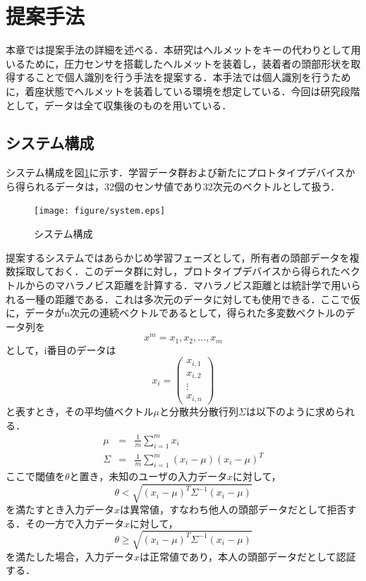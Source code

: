 \documentclass[Japanese]{dicomopapers}
\begin{document}
\section{提案手法}
本章では提案手法の詳細を述べる．本研究はヘルメットをキーの代わりとして用いるために，圧力センサを搭載したヘルメットを装着し，装着者の頭部形状を取得することで個人識別を行う手法を提案する．本手法では個人識別を行うために，着座状態でヘルメットを装着している環境を想定している．今回は研究段階として，データは全て収集後のものを用いている．

\subsection{システム構成}
システム構成を図\ref{system}に示す．学習データ群および新たにプロトタイプデバイスから得られるデータは，32個のセンサ値であり32次元のベクトルとして扱う．\par

\begin{figure}[!t]
  \begin{center}
    \texttt{[image: figure/system.eps]}
  \end{center}
  \caption{システム構成}
  \label{system}
\end{figure}

提案するシステムではあらかじめ学習フェーズとして，所有者の頭部データを複数採取しておく．このデータ群に対し，プロトタイプデバイスから得られたベクトルからのマハラノビス距離を計算する．マハラノビス距離とは統計学で用いられる一種の距離である．これは多次元のデータに対しても使用できる．ここで仮に，データがn次元の連続ベクトルであるとして，得られた多変数ベクトルのデータ列を
\[
  x^m = x_1, x_2, \ldots, x_m
\]
として，i番目のデータは
\[
  x_i = \left(
        \begin{array}{c}
            x_{i,1} \\
            x_{i,2} \\
            \vdots \\
            x_{i,n}
        \end{array}
    \right)
\]
と表すとき，その平均値ベクトル$\mu$と分散共分散行列$\Sigma$は以下のように求められる．
\begin{eqnarray*}
  \mu &=& \frac{1}{m}\sum_{i=1}^{m}x_i \\
  \Sigma &=& \frac{1}{m}\sum_{i=1}^{m}(x_i-\mu)(x_i-\mu)^T
\end{eqnarray*}
ここで閾値を$\theta$と置き，未知のユーザの入力データ$x$に対して，
\[
  \theta < \sqrt{(x_i-\mu)^{T}\Sigma^{-1}(x_i-\mu)}
\]
を満たすとき入力データ$x$は異常値，すなわち他人の頭部データだとして拒否する．その一方で入力データ$x$に対して，
\[
  \theta \geq \sqrt{(x_i-\mu)^{T}\Sigma^{-1}(x_i-\mu)}
\]
を満たした場合，入力データ$x$は正常値であり，本人の頭部データだとして認証する．
\end{document}
